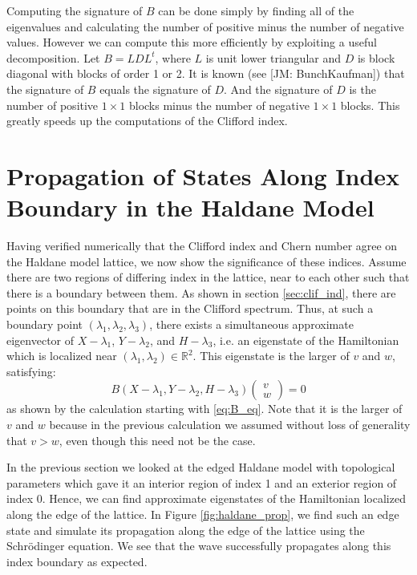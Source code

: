 \documentclass[a4paper]{article}
\newcommand{\jm}[1]{{\color{red} [JM: #1]}}
\begin{document}
Computing the signature of $B$ can be done simply by finding all of the eigenvalues and calculating the number of positive minus the number of negative values.
However we can compute this more efficiently by exploiting a useful decomposition.
Let $B = LDL^t$, where $L$ is unit lower triangular and $D$ is block diagonal with blocks of order 1 or 2.
It is known (see \jm{BunchKaufman}) that the signature of $B$ equals the signature of $D$.
And the signature of $D$ is the number of positive $1 \times 1$ blocks minus the number of negative $1 \times 1$ blocks.
This greatly speeds up the computations of the Clifford index.

\section{Propagation of States Along Index Boundary in the Haldane Model}

Having verified numerically that the Clifford index and Chern number agree on the Haldane model lattice, we now show the significance of these indices.
Assume there are two regions of differing index in the lattice, near to each other such that there is a boundary between them.
As shown in section \ref{sec:clif_ind}, there are points on this boundary that are in the Clifford spectrum.
Thus, at such a boundary point $(\lambda_1,\lambda_2,\lambda_3)$, there exists a simultaneous approximate eigenvector of $X-\lambda_1$, $Y-\lambda_2$, and $H-\lambda_3$, i.e. an eigenstate of the Hamiltonian which is localized near $(\lambda_1,\lambda_2) \in \mathbb{R}^2$.
This eigenstate is the larger of $v$ and $w$, satisfying:
\begin{equation}
B(X-\lambda_1,Y-\lambda_2,H-\lambda_3) \begin{pmatrix}v\\w\end{pmatrix} = 0
\end{equation}
as shown by the calculation starting with \eqref{eq:B_eq}.
Note that it is the larger of $v$ and $w$ because in the previous calculation we assumed without loss of generality that $v > w$, even though this need not be the case.
 
In the previous section we looked at the edged Haldane model with topological parameters which gave it an interior region of index 1 and an exterior region of index 0.
Hence, we can find approximate eigenstates of the Hamiltonian localized along the edge of the lattice.
In Figure \ref{fig:haldane_prop}, we find such an edge state and simulate its propagation along the edge of the lattice using the Schr{\"o}dinger equation.
We see that the wave successfully propagates along this index boundary as expected.
\end{document}
